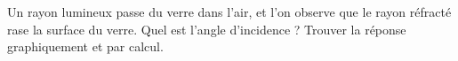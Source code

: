 

\begin{exercice}\label{exo105}
Un rayon lumineux passe du verre dans l'air, et l'on observe que le rayon réfracté rase la surface du verre. Quel est l'angle d'incidence ? Trouver la réponse graphiquement et par calcul.
\end{exercice}
